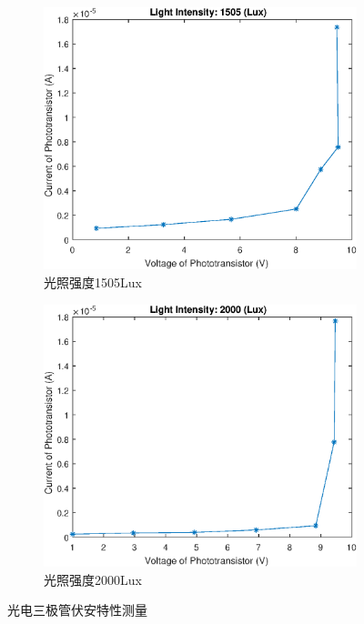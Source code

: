 \documentclass{ctexart}
\begin{document}
\begin{figure}[H]
\begin{subfigure}{.45\textwidth}
  \end{subfigure}
  \begin{subfigure}{.45\textwidth}
    \centering
    \includegraphics[width=\linewidth]{光电传感器综合实验图像/phototransistor_1505Lux}
    \caption{光照强度1505Lux}
  \end{subfigure}
  \begin{subfigure}{.45\textwidth}
    \centering
    \includegraphics[width=\linewidth]{光电传感器综合实验图像/phototransistor_2000Lux}
    \caption{光照强度2000Lux}
  \end{subfigure}
  \caption{光电三极管伏安特性测量}
\end{figure}
\end{document}
